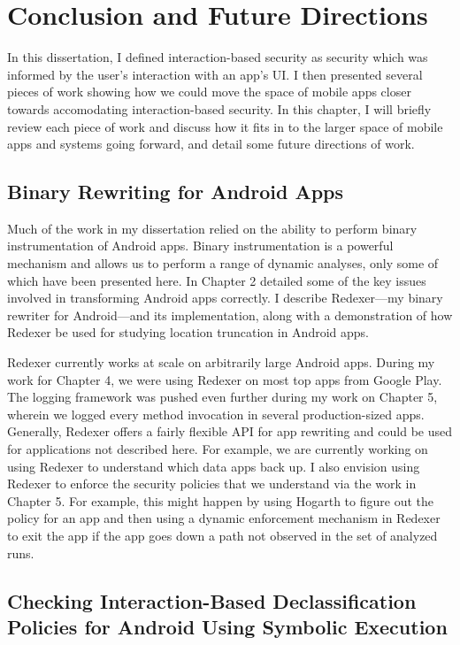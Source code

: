 \renewcommand{\thechapter}{6}

\chapter{Conclusion and Future Directions}

In this dissertation, I defined interaction-based security as security
which was informed by the user's interaction with an app's UI. I then
presented several pieces of work showing how we could move the space
of mobile apps closer towards accomodating interaction-based
security. In this chapter, I will briefly review each piece of work
and discuss how it fits in to the larger space of mobile apps and
systems going forward, and detail some future directions of work.

\section{Binary Rewriting for Android Apps}

Much of the work in my dissertation relied on the ability to perform
binary instrumentation of Android apps. Binary instrumentation is a
powerful mechanism and allows us to perform a range of dynamic
analyses, only some of which have been presented here. In Chapter 2
detailed some of the key issues involved in transforming Android apps
correctly. I describe Redexer---my binary rewriter for Android---and
its implementation, along with a demonstration of how Redexer be used
for studying location truncation in Android apps.

Redexer currently works at scale on arbitrarily large Android
apps. During my work for Chapter 4, we were using Redexer on most top
apps from Google Play. The logging framework was pushed even further
during my work on Chapter 5, wherein we logged every method invocation
in several production-sized apps. Generally, Redexer offers a fairly
flexible API for app rewriting and could be used for applications not
described here. For example, we are currently working on using Redexer
to understand which data apps back up. I also envision using Redexer
to enforce the security policies that we understand via the work in
Chapter 5. For example, this might happen by using Hogarth to figure
out the policy for an app and then using a dynamic enforcement
mechanism in Redexer to exit the app if the app goes down a path not
observed in the set of analyzed runs.

\section{Checking Interaction-Based Declassification Policies for Android Using Symbolic Execution}

